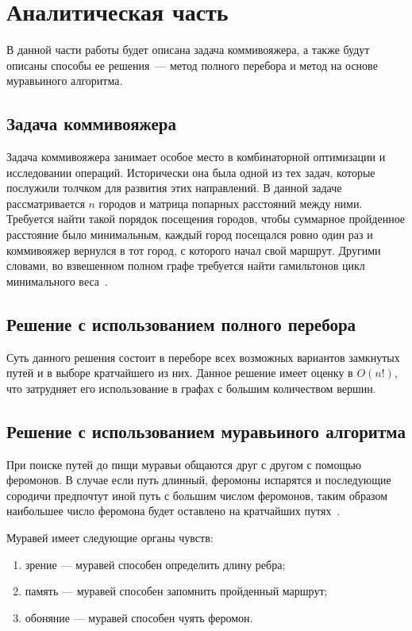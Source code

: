 \chapter{Аналитическая часть}
В данной части работы будет описана задача коммивояжера,  а также будут описаны способы ее решения~--- метод полного перебора и метод на основе муравьиного алгоритма.

\section{Задача коммивояжера}

Задача коммивояжера занимает особое место в комбинаторной оптимизации и  исследовании  операций. Исторически она 
была одной из тех задач, которые послужили толчком для развития 
этих направлений. В данной задаче рассматривается $n$ городов и матрица попарных расстояний между ними. 
Требуется найти такой порядок посещения городов, чтобы  суммарное пройденное расстояние было минимальным, каждый город посещался ровно один раз и коммивояжер вернулся в тот город, с которого начал свой маршрут.  
Другими словами, во взвешенном полном графе требуется найти гамильтонов цикл минимального веса~\cite{salesman}. 

\section{Решение с использованием полного перебора}
Суть данного решения состоит в переборе всех возможных вариантов замкнутых путей и в выборе кратчайшего из них. Данное решение имеет оценку в $O(n!)$, что затрудняет его использование в графах с большим количеством вершин.

\section{Решение с использованием муравьиного алгоритма}
При поиске путей до пищи муравьи общаются друг с другом с помощью феромонов.
В случае если путь длинный, феромоны испарятся и последующие сородичи предпочтут иной путь с большим числом феромонов, таким образом наибольшее число феромона будет оставлено на кратчайших путях~\cite{shtovba}.

Муравей имеет следующие органы чувств:
\begin{enumerate}[label=\arabic*)]
	\item зрение --- муравей способен определить длину ребра;
	\item память --- муравей способен запомнить пройденный маршрут;
	\item обоняние --- муравей способен чуять феромон.
\end{enumerate}

